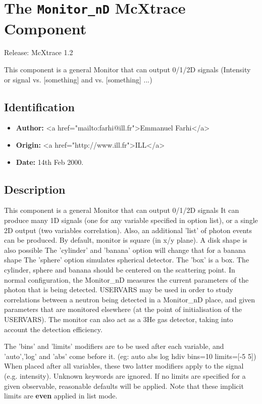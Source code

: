 \section{The \texttt{Monitor\_nD} McXtrace Component}
Release: McXtrace 1.2

This component is a general Monitor that can output 0/1/2D signals
(Intensity or signal vs. [something] and vs. [something] ...)

\subsection*{Identification}
\begin{itemize}
  \item \textbf{Author:} \textless{}a href="mailto:farhi@ill.fr"\textgreater{}Emmanuel Farhi\textless{}/a\textgreater{}
  \item \textbf{Origin:} \textless{}a href="http://www.ill.fr"\textgreater{}ILL\textless{}/a\textgreater{}
  \item \textbf{Date:} 14th Feb 2000.
\end{itemize}

\subsection*{Description}
This component is a general Monitor that can output 0/1/2D signals It can produce many 1D signals (one for any variable specified in option list), or a single 2D output (two variables correlation). Also, an additional 'list' of photon events can be produced. By default, monitor is square (in x/y plane). A disk shape is also possible The 'cylinder' and 'banana' option will change that for a banana shape The 'sphere' option simulates spherical detector. The 'box' is a box. The cylinder, sphere and banana should be centered on the scattering point. In normal configuration, the Monitor\_nD measures the current parameters of the photon that is being detected. USERVARS may be used in order to study correlations between a neutron being detected in a Monitor\_nD place, and given parameters that are monitored elsewhere (at the point of initialisation of the USERVARS). The monitor can also act as a 3He gas detector, taking into account the detection efficiency.

The 'bins' and 'limits' modifiers are to be used after each variable, and 'auto','log' and 'abs' come before it. (eg: auto abs log hdiv bins=10 limits=[-5 5]) When placed after all variables, these two latter modifiers apply to the signal (e.g. intensity). Unknown keywords are ignored. If no limits are specified for a given observable, reasonable defaults will be applied. Note that these implicit limits are \textbf{even} applied in list mode.

